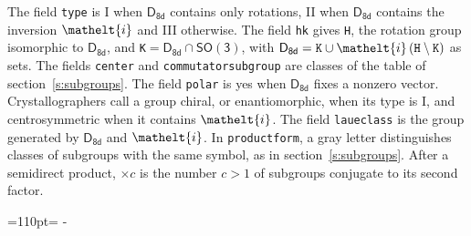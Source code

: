\documentclass[10pt,a4paper]{article}
\makeatletter
\def\grouprule#1#2{\noalign{\marks\LTgroupmarks{\the\belowrulesep}\nobreak\vskip#1%
  \vskip\aboverulesep}\multispan\LT@cols\unskip{\leaders\hrule\@height#2\hfill\kern\z@}\cr
  \noalign{\penalty\LTrulebreak\vskip\belowrulesep\global\@lastruleclass\z@}}
\newcommand{\needspace}[1]{\par\penalty-100\begingroup\dimen0=#1\relax\dimen2=\pagegoal
  \advance\dimen2-\pagetotal\ifdim\dimen0>\dimen2\relax\ifdim\dimen2>0pt\vfil\break\fi\fi
  \endgroup}
\numberwithin{equation}{section}
\newcommand{\eltfont}[1]{{\let\sigma\eltsigma\mathelt{#1}}}
\newcommand{\grp}[1]{\mathsf{#1}}
\newcommand{\elt}[1]{\eltfont{#1}}
\newcommand{\hmname}[1]{#1}
\newcommand{\orbname}[1]{#1}
\newcommand{\conwayname}[1]{#1}
\newcommand{\igname}[1]{#1}
\newcommand{\olivename}[1]{#1}
\makeatother
\begin{document}
{}
\leavevmode\label{n:element.inversion}The field \texttt{type} is I when $\grp{D_{8d}}$ contains only rotations, II when $\grp{D_{8d}}$ contains the inversion $\elt{i}$ and III otherwise. The field \texttt{hk} gives \texttt{H}, the rotation group isomorphic to $\grp{D_{8d}}$, and \texttt{K}${} = \grp{D_{8d}} \cap \grp{SO(3)}$, with $\grp{D_{8d}} = \texttt{K} \cup \elt{i}\,(\texttt{H} \setminus \texttt{K})$ as sets. The fields \texttt{center} and \texttt{commutatorsubgroup} are classes of the table of section~\ref{s:subgroups}. The field \texttt{polar} is yes when $\grp{D_{8d}}$ fixes a nonzero vector. Crystallographers call a group chiral, or enantiomorphic, when its type is I, and centrosymmetric when it contains $\elt{i}$. The field \texttt{laueclass} is the group generated by $\grp{D_{8d}}$ and $\elt{i}$.
In \texttt{productform}, a gray letter distinguishes classes of subgroups with the same symbol, as in section~\ref{s:subgroups}. \label{n:index.conjugates.c}After a semidirect product, ${\times}c$ is the number $c > 1$ of subgroups conjugate to its second factor.
\needspace{110pt}
\end{document}
